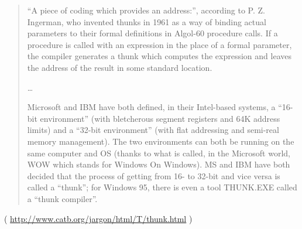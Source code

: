 

\begin{framed}
\begin{quotation}
“A piece of coding which provides an address:”, according to P. Z. Ingerman, 
who invented thunks in 1961 as a way of binding actual parameters to their formal 
definitions in Algol-60 procedure calls. If a procedure is called with an expression 
in the place of a formal parameter, the compiler generates a thunk which computes 
the expression and leaves the address of the result in some standard location.

\dots

Microsoft and IBM have both defined, in their Intel-based systems, a “16-bit environment” 
(with bletcherous segment registers and 64K address limits) and a “32-bit environment” 
(with flat addressing and semi-real memory management). The two environments can both be 
running on the same computer and OS (thanks to what is called, in the Microsoft world, 
WOW which stands for Windows On Windows). MS and IBM have both decided that the process 
of getting from 16- to 32-bit and vice versa is called a “thunk”; for Windows 95, 
there is even a tool THUNK.EXE called a “thunk compiler”.
\end{quotation}
\end{framed}
( \url{http://www.catb.org/jargon/html/T/thunk.html} )
